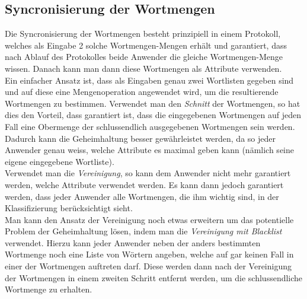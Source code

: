 \documentclass{article}
\theoremstyle{definition}
\theoremstyle{remark}
\begin{document}
\subsection{Syncronisierung der Wortmengen}
Die Syncronisierung der Wortmengen besteht prinzipiell in einem Protokoll,
welches als Eingabe 2 solche Wortmengen-Mengen erh\"alt und garantiert, dass
nach Ablauf des Protokolles beide Anwender die gleiche Wortmengen-Menge 
wissen. Danach kann man dann diese Wortmengen als Attribute verwenden.\\
Ein einfacher Ansatz ist, dass als Eingaben genau zwei Wortlisten gegeben
sind und auf diese eine Mengenoperation angewendet wird, um die
resultierende Wortmengen zu bestimmen. Verwendet man den {\em Schnitt} 
der Wortmengen, so hat dies den Vorteil, dass garantiert ist, dass die 
eingegebenen Wortmengen auf jeden Fall eine Obermenge der schlussendlich
ausgegebenen Wortmengen sein werden. Dadurch kann die Geheimhaltung
besser gew\"ahrleistet werden, da so jeder Anwender genau weiss, welche
Attribute es maximal geben kann (n\"amlich seine eigene eingegebene
Wortliste).\\
Verwendet man die {\em Vereinigung}, so kann dem Anwender
nicht mehr garantiert werden, welche Attribute verwendet werden. Es
kann dann jedoch garantiert werden, dass jeder Anwender alle Wortmengen,
die ihm wichtig sind, in der Klassifizierung ber\"ucksichtigt sieht.\\
Man kann den Ansatz der Vereinigung noch etwas erweitern um das potentielle
Problem der Geheimhaltung l\"osen, indem man die {\em Vereinigung mit
Blacklist} verwendet. Hierzu kann jeder Anwender neben der anders
bestimmten Wortmenge noch eine Liste von W\"ortern angeben, welche
auf gar keinen Fall in einer der Wortmengen auftreten darf. Diese werden
dann nach der Vereinigung der Wortmengen in einem zweiten Schritt 
entfernt werden, um die schlussendliche Wortmenge zu erhalten.
\end{document}
